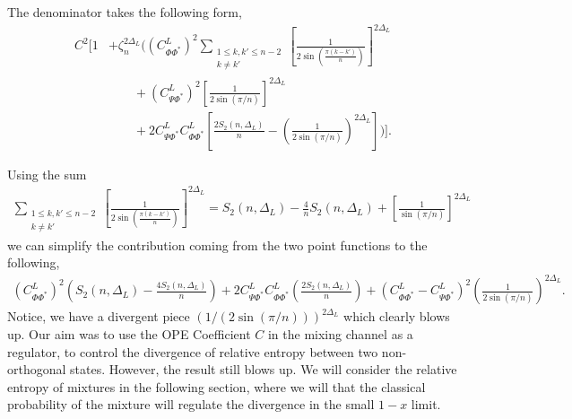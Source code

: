 \documentclass[11pt]{article}
\newcommand{\ep}{\epsilon}
\newcommand{\mO}{\mathcal{O}}
\newcommand{\lb}{\left(}
\newcommand{\rb}{\right)}
\begin{document}
The denominator takes the following form,
\begin{align}
C^2\Bigg[
1
&+ \zeta_n^{2\Delta_L}
\Bigg(
\left(C_{\Phi\Phi^*}^{L}\right)^2
\sum_{\substack{1\le k,k'\le n-2\\ k\neq k'}}
\left[
\frac{1}{2\sin\!\left(\frac{\pi(k-k')}{n}\right)}
\right]^{2\Delta_L}
\nonumber\\
&\qquad
+ \left(C_{\Psi\Phi^*}^{L}\right)^2
\left[
\frac{1}{2\sin(\pi/n)}
\right]^{2\Delta_{L}}
\nonumber\\
&\qquad
+ 2C_{\Psi\Phi^*}^{L}C_{\Phi\Phi^*}^{L}
\left[
\frac{2S_2(n,\Delta_L)}{n}
-
\left(\frac{1}{2\sin(\pi/n)}\right)^{2\Delta_L}
\right]
\Bigg)
\Bigg] .
\end{align}

Using the sum
\begin{align}
    \sum_{\substack{1\le k,k'\le n-2\\ k\neq k'}}
\left[
\frac{1}{2\sin\!\left(\frac{\pi(k-k')}{n}\right)}
\right]^{2\Delta_L} = 
S_2(n,\Delta_L)
-\frac{4}{n}S_2(n,\Delta_L)
+\left[\frac{1}{\sin(\pi/n)}\right]^{2\Delta_L}
\end{align}
we can simplify the contribution coming from the two point functions to the following,
\begin{align}
\left(C_{\Phi\Phi^*}^{L}\right)^2 \lb S_2(n,\Delta_L) - \frac{4S_2(n,\Delta_L)}{n}\rb + 2C_{\Psi\Phi^*}^{L}C_{\Phi\Phi^*}^{L} \lb\frac{2S_2(n,\Delta_L)}{n}\rb + \lb  C_{\Phi\Phi^*}^{L} - C_{\Psi\Phi^*}^{L} \rb^2\left(\frac{1}{2\sin(\pi/n)}\right)^{2\Delta_L}.
\end{align}
Notice, we have a divergent piece $\lb 1/(2\sin(\pi/n))\rb^{2\Delta_L}$ which clearly blows up. Our aim was to use the OPE Coefficient $C$ in the mixing channel as a regulator, to control the divergence of relative entropy between two non-orthogonal states. However, the result still blows up. 
We will consider the relative entropy of mixtures in the following section, where we will that the classical probability of the mixture will regulate the divergence in the small $1-x$ limit. 




\end{document}

